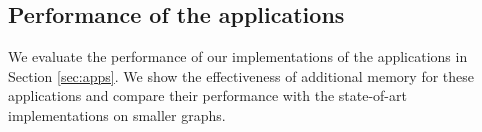 
%		


\subsection{Performance of the applications}

We evaluate the performance of our implementations of the applications in
Section \ref{sec:apps}. We show the effectiveness of additional memory for
these applications and compare their performance with the state-of-art
implementations on smaller graphs.

